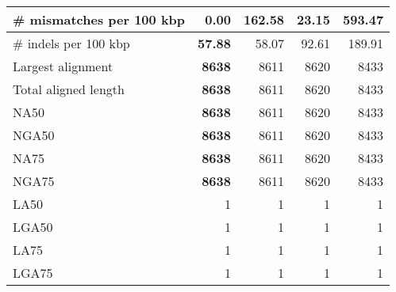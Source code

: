 \documentclass[12pt,a4paper]{article}
\begin{document}
\begin{table}[ht]
\begin{center}
\begin{tabular}{|l*{4}{|r}|}
\# mismatches per 100 kbp & {\bf 0.00} & 162.58 & 23.15 & 593.47 \\ \hline
\# indels per 100 kbp & {\bf 57.88} & 58.07 & 92.61 & 189.91 \\ \hline
Largest alignment & {\bf 8638} & 8611 & 8620 & 8433 \\ \hline
Total aligned length & {\bf 8638} & 8611 & 8620 & 8433 \\ \hline
NA50 & {\bf 8638} & 8611 & 8620 & 8433 \\ \hline
NGA50 & {\bf 8638} & 8611 & 8620 & 8433 \\ \hline
NA75 & {\bf 8638} & 8611 & 8620 & 8433 \\ \hline
NGA75 & {\bf 8638} & 8611 & 8620 & 8433 \\ \hline
LA50 & 1 & 1 & 1 & 1 \\ \hline
LGA50 & 1 & 1 & 1 & 1 \\ \hline
LA75 & 1 & 1 & 1 & 1 \\ \hline
LGA75 & 1 & 1 & 1 & 1 \\ \hline
\end{tabular}
\end{center}
\end{table}
\end{document}
